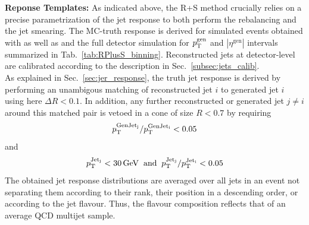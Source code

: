 \begin{description}
 \item \textbf{Reponse Templates:}
As indicated above, the R+S method crucially relies on a precise parametrization of the jet response to both perform the rebalancing and the jet smearing. The MC-truth response is derived for simulated events obtained with  as well as \madgraph and the full detector simulation for $p_{\text{T}}^\mathrm{gen}$ and $|\eta^\mathrm{gen}|$ intervals summarized in Tab.~\ref{tab:RPlusS_binning}. Reconstructed jets at detector-level are calibrated according to the description in Sec.~\ref{subsec:jets_calib}. \\
As explained in Sec.~\ref{sec:jer_response}, the truth jet response is derived by performing an unambigous matching of reconstructed jet $i$ to generated jet $i$ using here $\Delta R < 0.1$. In addition, any further reconstructed or generated jet $j \ne i$ around this matched pair is vetoed in a cone of size $R < 0.7$ by requiring
\begin{equation}
 p_{\text{T}}^{\rm{GenJet}_j} / p_{\text{T}}^{\rm{GenJet}_i} < 0.05
\end{equation} 
and
\begin{equation}
 p_{\text{T}}^{\rm{Jet}_j} < 30\,\mathrm{GeV} \;\; \mathrm{and} \;\; p_{\text{T}}^{\rm{Jet}_j} / p_{\text{T}}^{\rm{Jet}_i} < 0.05
\end{equation} 
The obtained jet response distributions are averaged over all jets in an event not separating them according to their rank, \ie their position in a descending \pt order, or according to the jet flavour. Thus, the flavour composition reflects that of an average QCD multijet sample. 
\begin{table}[!t]
\centering
\caption{Overview of the $|\eta|$ and $\pt^{ave}$ interval boundaries used for the MC-truth response determination used as input for the R+S method.}
\label{tab:RPlusS_binning}
\end{table} 

\end{description}
